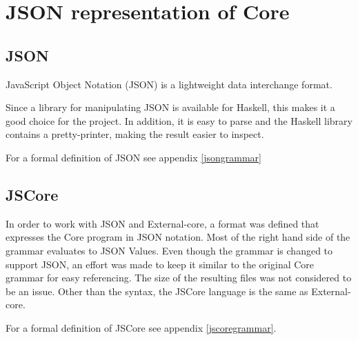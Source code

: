 \section{JSON representation of Core}

\subsection{JSON}

JavaScript Object Notation (JSON) is a lightweight data interchange format.

Since a library for manipulating JSON is available for Haskell, this
makes it a good choice for the project. In addition, it is easy to parse and
the Haskell library contains a pretty-printer, making the result easier to
inspect.

For a formal definition of JSON see appendix \ref{jsongrammar}

\subsection{JSCore}

In order to work with JSON and External-core, a format was defined that
expresses the Core program in JSON notation. Most of the right hand side of 
the grammar evaluates to JSON Values. 
Even though the grammar is changed to support JSON, an effort was made to
keep it similar to the original Core grammar for easy referencing. The size
of the resulting files was not considered to be an issue. Other than the 
syntax, the JSCore language is the same as External-core.

For a formal definition of JSCore see appendix \ref{jscoregrammar}.

